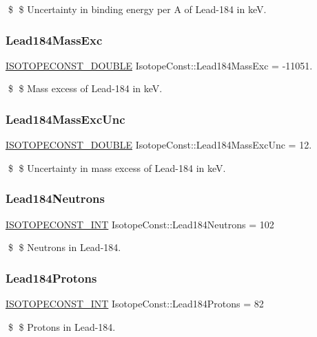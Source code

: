 \$ \$ Uncertainty in binding energy per A of Lead-\/184 in keV. \mbox{\label{group___isotope_const-_lead-_pb184_ga8da2d3abdf250925903998d79a6193d8}} 
\subsubsection{\texorpdfstring{Lead184\+Mass\+Exc}{Lead184MassExc}}
{\footnotesize\ttfamily \mbox{\hyperlink{group___isotope_const-_macros_ga8f45a7272ce02c0b4c65c44636ed719a}{I\+S\+O\+T\+O\+P\+E\+C\+O\+N\+S\+T\+\_\+\+D\+O\+U\+B\+LE}} Isotope\+Const\+::\+Lead184\+Mass\+Exc = -\/11051.}

\$ \$ Mass excess of Lead-\/184 in keV. \mbox{\label{group___isotope_const-_lead-_pb184_ga13939c4ab5648ccc28afefa8e5e77767}} 
\subsubsection{\texorpdfstring{Lead184\+Mass\+Exc\+Unc}{Lead184MassExcUnc}}
{\footnotesize\ttfamily \mbox{\hyperlink{group___isotope_const-_macros_ga8f45a7272ce02c0b4c65c44636ed719a}{I\+S\+O\+T\+O\+P\+E\+C\+O\+N\+S\+T\+\_\+\+D\+O\+U\+B\+LE}} Isotope\+Const\+::\+Lead184\+Mass\+Exc\+Unc = 12.}

\$ \$ Uncertainty in mass excess of Lead-\/184 in keV. \mbox{\label{group___isotope_const-_lead-_pb184_gacb8e26d6cead62496a16d493408f1e29}} 
\subsubsection{\texorpdfstring{Lead184\+Neutrons}{Lead184Neutrons}}
{\footnotesize\ttfamily \mbox{\hyperlink{group___isotope_const-_macros_ga5f18360b3e99483a35c32d789e62621c}{I\+S\+O\+T\+O\+P\+E\+C\+O\+N\+S\+T\+\_\+\+I\+NT}} Isotope\+Const\+::\+Lead184\+Neutrons = 102}

\$ \$ Neutrons in Lead-\/184. \mbox{\label{group___isotope_const-_lead-_pb184_ga7675b4e330d98314b885e9fd8ab03f45}} 
\subsubsection{\texorpdfstring{Lead184\+Protons}{Lead184Protons}}
{\footnotesize\ttfamily \mbox{\hyperlink{group___isotope_const-_macros_ga5f18360b3e99483a35c32d789e62621c}{I\+S\+O\+T\+O\+P\+E\+C\+O\+N\+S\+T\+\_\+\+I\+NT}} Isotope\+Const\+::\+Lead184\+Protons = 82}

\$ \$ Protons in Lead-\/184. 
